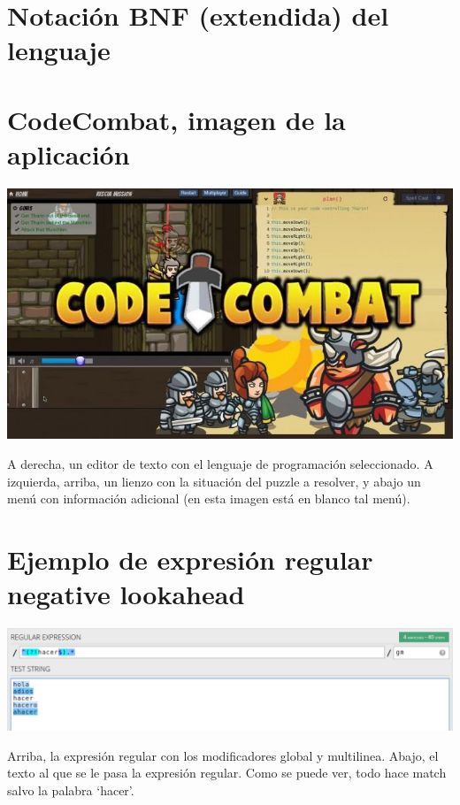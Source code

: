 \documentclass{report}
\begin{document}
	\chapter{Notación BNF (extendida) del lenguaje} \label{app:a}
	
	
	\chapter{CodeCombat, imagen de la aplicación} \label{app:b}
	
	\begin{center}
	\includegraphics[width=1\linewidth]{codecombat}
	
	A derecha, un editor de texto con el lenguaje de programación seleccionado. A izquierda, arriba, un lienzo con la situación del puzzle a resolver, y abajo un menú con información adicional (en esta imagen está en blanco tal menú).
	\end{center}
	
	\chapter{Ejemplo de expresión regular negative lookahead} \label{app:c}
	
	\begin{center}
		\includegraphics[width=1\linewidth]{negativelookahead}
		
		Arriba, la expresión regular con los modificadores global y multilinea.
		Abajo, el texto al que se le pasa la expresión regular. Como se puede ver, todo hace match salvo la palabra `hacer'.
	\end{center}
	
\end{document}
